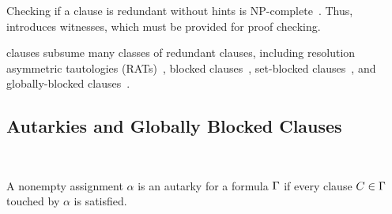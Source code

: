 




Checking if a clause is redundant without hints is NP-complete~\cite{prclause}.
Thus, \pr introduces witnesses, which must be provided for proof checking.

\pr clauses subsume many classes of redundant clauses, including resolution
asymmetric tautologies (RATs)~\cite{rat}, blocked clauses~\cite{blockedclause},
set-blocked clauses~\cite{setblocked}, and globally-blocked
clauses~\cite{conditionalautarkies}.

\subsection{Autarkies and Globally Blocked Clauses}~\label{subsec:autarkies}


\begin{definition}[Autarky]
    A nonempty assignment $\alpha$ is an autarky for a formula $\Gamma$ if
    every clause $C \in \Gamma$ touched by $\alpha$ is satisfied.
\end{definition}


